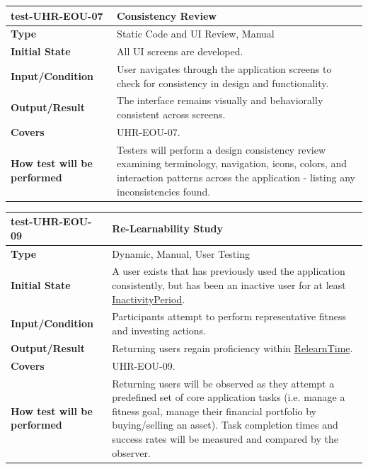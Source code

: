 \documentclass[12pt, titlepage]{article}
\newcommand{\const}[1]{\hyperlink{const:#1}{\textsf{#1}}}
\begin{document}
\vspace{1em}

\noindent\begin{tabularx}{\textwidth}{>{\raggedright\arraybackslash}p{3.5cm}X}
  \toprule
  \textbf{test-UHR-EOU-07} & \textbf{Consistency Review}\\
  \midrule
  \textbf{Type} & Static Code and UI Review, Manual\\
  \textbf{Initial State} & All UI screens are developed.\\
  \textbf{Input/Condition} & User navigates through the application screens to check for consistency in design and functionality.\\
  \textbf{Output/Result} & The interface remains visually and behaviorally consistent across screens.\\
  \textbf{Covers} & UHR-EOU-07.\\
  \textbf{How test will be performed} & Testers will perform a design consistency review examining terminology, navigation, icons, colors, and interaction patterns across the application - listing any inconsistencies found.\\
  \bottomrule
\end{tabularx}

\vspace{1em}

\noindent\begin{tabularx}{\textwidth}{>{\raggedright\arraybackslash}p{3.5cm}X}
  \toprule
  \textbf{test-UHR-EOU-09} & \textbf{Re-Learnability Study}\\
  \midrule
  \textbf{Type} & Dynamic, Manual, User Testing\\
  \textbf{Initial State} & A user exists that has previously used the application consistently, but has been an inactive user for at least \const{InactivityPeriod}.\\
  \textbf{Input/Condition} & Participants attempt to perform representative fitness and investing actions.\\
  \textbf{Output/Result} & Returning users regain proficiency within \const{RelearnTime}.\\
  \textbf{Covers} & UHR-EOU-09.\\
  \textbf{How test will be performed} & Returning users will be observed as they attempt a predefined set of core application tasks (i.e. manage a fitness goal, manage their financial portfolio by buying/selling an asset). Task completion times and success rates will be measured and compared by the observer.\\
  \bottomrule
\end{tabularx}
\end{document}
